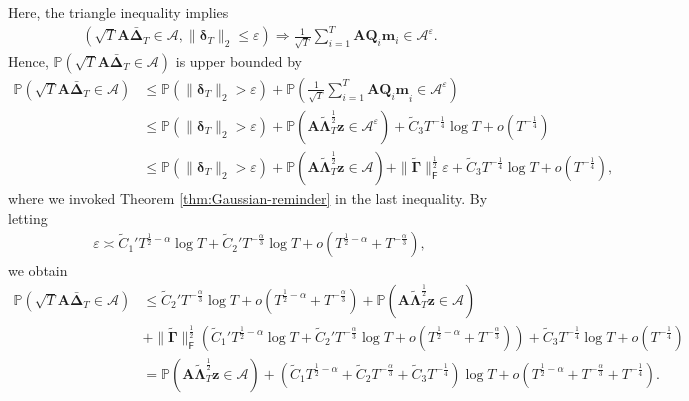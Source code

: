 Here, the triangle inequality implies
\begin{align*}
\left(\sqrt{T}\bm{A}\bar{\bm{\Delta}}_T \in \mathcal{A},\|\bm{\delta}_T\|_2 \leq \varepsilon \right) \Rightarrow \frac{1}{\sqrt{T}}\sum_{i=1}^T\bm{AQ}_i{\bm{m}}_i \in \mathcal{A}^{\varepsilon}.
\end{align*}
Hence, $\mathbb{P}(\sqrt{T}\bm{A}\bar{\bm{\Delta}}_T \in \mathcal{A})$ is upper bounded by
\begin{align*}
\mathbb{P}(\sqrt{T}\bm{A}\bar{\bm{\Delta}}_T \in \mathcal{A}) 
&\leq \mathbb{P}(\|\bm{\delta}_T\|_2 > \varepsilon) + \mathbb{P}\left(\frac{1}{\sqrt{T}}\sum_{i=1}^T{\bm{AQ}_i\bm{m}}_i \in \mathcal{A}^{\varepsilon}\right)\\
&\leq \mathbb{P}(\|\bm{\delta}_T\|_2 > \varepsilon) + \mathbb{P}\left(\bm{A}\widetilde{\bm{\Lambda}}_T^{\frac{1}{2}}\bm{z} \in \mathcal{A}^{\varepsilon}\right)+\widetilde{C}_3 T^{-\frac{1}{4}}{\log T}  + o(T^{-\frac{1}{4}})\\ 
&\leq \mathbb{P}(\|\bm{\delta}_T\|_2 > \varepsilon) + \mathbb{P}\left(\bm{A}\widetilde{\bm{\Lambda}}_T^{\frac{1}{2}}\bm{z} \in \mathcal{A}\right) + \|\tilde{\bm{\Gamma}}\|_{\mathsf{F}}^{\frac{1}{2}}\varepsilon +\widetilde{C}_3 T^{-\frac{1}{4}}{\log T}  + o(T^{-\frac{1}{4}}),
\end{align*}
where we invoked Theorem \ref{thm:Gaussian-reminder} in the last inequality. By letting 
\begin{align*}
\varepsilon \asymp \widetilde{C}_1'T^{\frac{1}{2}-\alpha}\log T + \widetilde{C}_2'T^{-\frac{\alpha}{3}}\log T + o(T^{\frac{1}{2}-\alpha} + T^{-\frac{\alpha}{3}}),
\end{align*}
we obtain
\begin{align*}
\mathbb{P}(\sqrt{T}\bm{A}\bar{\bm{\Delta}}_T \in \mathcal{A}) 
&\leq \widetilde{C}_2'T^{-\frac{\alpha}{3}}\log T + o(T^{\frac{1}{2}-\alpha} + T^{-\frac{\alpha}{3}})  + \mathbb{P}\left(\bm{A}\widetilde{\bm{\Lambda}}_T^{\frac{1}{2}}\bm{z} \in \mathcal{A}\right) \\ 
&+ \|\tilde{\bm{\Gamma}}\|_{\mathsf{F}}^{\frac{1}{2}} \left(\widetilde{C}_1'T^{\frac{1}{2}-\alpha}\log T + \widetilde{C}_2'T^{-\frac{\alpha}{3}}\log T + o(T^{\frac{1}{2}-\alpha} + T^{-\frac{\alpha}{3}})\right) +\widetilde{C}_3 T^{-\frac{1}{4}}{\log T}  + o(T^{-\frac{1}{4}}) \\ 
&= \mathbb{P}\left(\bm{A}\widetilde{\bm{\Lambda}}_T^{\frac{1}{2}}\bm{z} \in \mathcal{A}\right) + (\widetilde{C}_1 T^{\frac{1}{2}-\alpha} + \widetilde{C}_2 T^{-\frac{\alpha}{3}}+ \widetilde{C}_3 T^{-\frac{1}{4}}){\log T}  + o(T^{\frac{1}{2}-\alpha} + T^{-\frac{\alpha}{3}} + T^{-\frac{1}{4}}).
\end{align*}
